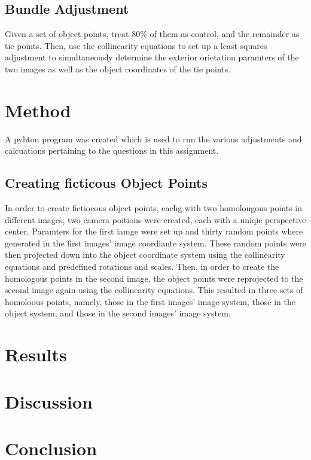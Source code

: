 \documentclass{article}
\begin{document}
\subsection{Bundle Adjustment}
Given a set of object points, treat 80\% of them as control, and the remainder as tie points. 
Then, use the collinearity equations to set up a least squares adjustment to simultaneously determine the exterior 
orietation paramters of the two images as well as the object coordinates of the tie points.


\section{Method}
A pyhton program was created which is used to run the various adjustments and calcuations pertaining to the questions 
in this assignment.

\subsection{Creating ficticous Object Points}
In order to create fictiocous object points, eachg with two homolougous points in different images, 
two camera poitions were created, each with a uniqie perspective center. 
Paramters for the first iamge were set up and thirty random points where generated in the first images' image coordiante system. 
These random points were then projected down into the object coordinate system using the collinearity equations and 
predefined rotations and scales. Then, in order to create the homologous points in the second image, the object points were 
reprojected to the second image again using the collinearity equations. 
This resulted in three sets of homoloous points, namely, those in the first images' image system, those in the object system, 
and those in the second images' image system.


\section{Results}

\section{Discussion}

\section{Conclusion}
\end{document}
